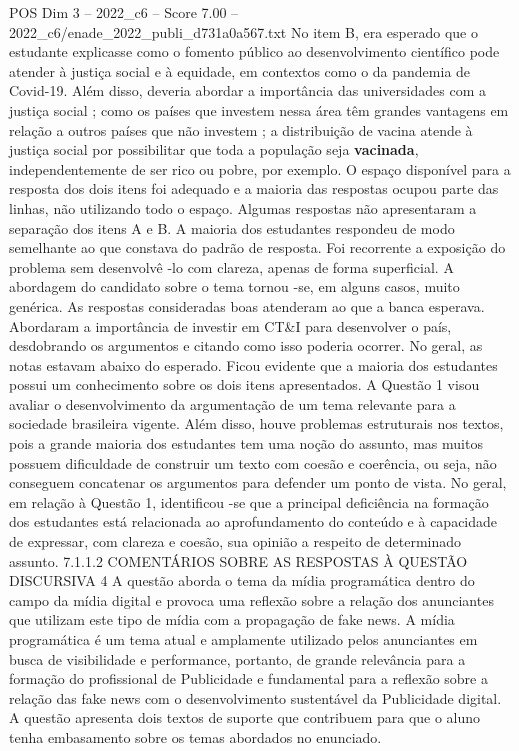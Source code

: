 \begin{textsample}{POS Dim 3 – 2022\_c6 – Score 7.00 – 2022\_c6/enade\_2022\_publi\_d731a0a567.txt}
No item B, era esperado que o estudante explicasse como o fomento público ao desenvolvimento científico pode atender à justiça social e à equidade, em contextos como o da pandemia de Covid-19.
Além disso, deveria abordar a importância das universidades com a justiça social ; como os países que investem nessa área têm grandes vantagens em relação a outros países que não investem ; a distribuição de vacina atende à justiça social por possibilitar que toda a população seja \textbf{vacinada}, independentemente de ser rico ou pobre, por exemplo.
O espaço disponível para a resposta dos dois itens foi adequado e a maioria das respostas ocupou parte das linhas, não utilizando todo o espaço.
Algumas respostas não apresentaram a separação dos itens A e B.
A maioria dos estudantes respondeu de modo semelhante ao que constava do padrão de resposta.
Foi recorrente a exposição do problema sem desenvolvê -lo com clareza, apenas de forma superficial.
A abordagem do candidato sobre o tema tornou -se, em alguns casos, muito genérica.
As respostas consideradas boas atenderam ao que a banca esperava.
Abordaram a importância de investir em CT\&I para desenvolver o país, desdobrando os argumentos e citando como isso poderia ocorrer.
No geral, as notas estavam abaixo do esperado.
Ficou evidente que a maioria dos estudantes possui um conhecimento sobre os dois itens apresentados.
A Questão 1 visou avaliar o desenvolvimento da argumentação de um tema relevante para a sociedade brasileira vigente.
Além disso, houve problemas estruturais nos textos, pois a grande maioria dos estudantes tem uma noção do assunto, mas muitos possuem dificuldade de construir um texto com coesão e coerência, ou seja, não conseguem concatenar os argumentos para defender um ponto de vista.
No geral, em relação à Questão 1, identificou -se que a principal deficiência na formação dos estudantes está relacionada ao aprofundamento do conteúdo e à capacidade de expressar, com clareza e coesão, sua opinião a respeito de determinado assunto. 7.1.1.2 COMENTÁRIOS SOBRE AS RESPOSTAS À QUESTÃO DISCURSIVA 4 A questão aborda o tema da mídia programática dentro do campo da mídia digital e provoca uma reflexão sobre a relação dos anunciantes que utilizam este tipo de mídia com a propagação de fake news.
A mídia programática é um tema atual e amplamente utilizado pelos anunciantes em busca de visibilidade e performance, portanto, de grande relevância para a formação do profissional de Publicidade e fundamental para a reflexão sobre a relação das fake news com o desenvolvimento sustentável da Publicidade digital.
A questão apresenta dois textos de suporte que contribuem para que o aluno tenha embasamento sobre os temas abordados no enunciado.

\end{textsample}
